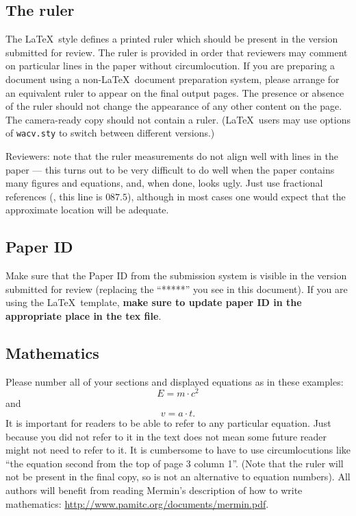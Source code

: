 \subsection{The ruler}
The \LaTeX\ style defines a printed ruler which should be present in the version submitted for review.
The ruler is provided in order that reviewers may comment on particular lines in the paper without circumlocution.
If you are preparing a document using a non-\LaTeX\ document preparation system, please arrange for an equivalent ruler to appear on the final output pages.
The presence or absence of the ruler should not change the appearance of any other content on the page.
The camera-ready copy should not contain a ruler.
(\LaTeX\ users may use options of \texttt{wacv.sty} to switch between different versions.)

Reviewers:
note that the ruler measurements do not align well with lines in the paper --- this turns out to be very difficult to do well when the paper contains many figures and equations, and, when done, looks ugly.
Just use fractional references (\eg, this line is $087.5$), although in most cases one would expect that the approximate location will be adequate.


\subsection{Paper ID}
Make sure that the Paper ID from the submission system is visible in the version submitted for review (replacing the ``*****'' you see in this document).
If you are using the \LaTeX\ template, \textbf{make sure to update paper ID in the appropriate place in the tex file}.


\subsection{Mathematics}

Please number all of your sections and displayed equations as in these examples:
\begin{equation}
  E = m\cdot c^2
  \label{eq:important}
\end{equation}
and
\begin{equation}
  v = a\cdot t.
  \label{eq:also-important}
\end{equation}
It is important for readers to be able to refer to any particular equation.
Just because you did not refer to it in the text does not mean some future reader might not need to refer to it.
It is cumbersome to have to use circumlocutions like ``the equation second from the top of page 3 column 1''.
(Note that the ruler will not be present in the final copy, so is not an alternative to equation numbers).
All authors will benefit from reading Mermin's description of how to write mathematics:
\url{http://www.pamitc.org/documents/mermin.pdf}.

